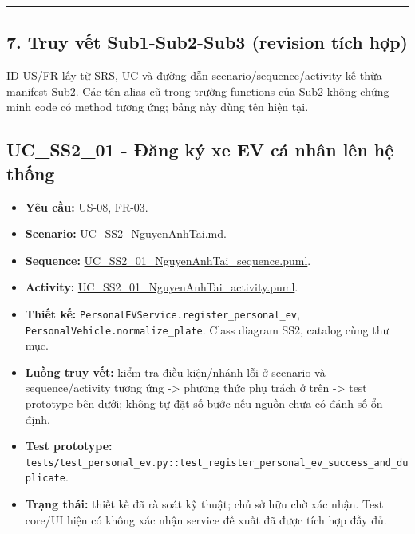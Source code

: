 \documentclass[11pt,a4paper]{article}
\providecommand{\tightlist}{%
  \setlength{\itemsep}{0pt}\setlength{\parskip}{0pt}}
\begin{document}
\begin{center}\rule{0.5\linewidth}{0.5pt}\end{center}

\hypertarget{truy-vux1ebft-sub1-sub2-sub3-revision-tuxedch-hux1ee3p}{%
\subsection{7. Truy vết Sub1-Sub2-Sub3 (revision tích
hợp)}\label{truy-vux1ebft-sub1-sub2-sub3-revision-tuxedch-hux1ee3p}}

ID US/FR lấy từ SRS, UC và đường dẫn scenario/sequence/activity kế thừa
manifest Sub2. Các tên alias cũ trong trường functions của Sub2 không
chứng minh code có method tương ứng; bảng này dùng tên hiện tại.

\hypertarget{uc_ss2_01---ux111ux103ng-kuxfd-xe-ev-cuxe1-nhuxe2n-luxean-hux1ec7-thux1ed1ng}{%
\subsection{UC\_SS2\_01 - Đăng ký xe EV cá nhân lên hệ
thống}\label{uc_ss2_01---ux111ux103ng-kuxfd-xe-ev-cuxe1-nhuxe2n-luxean-hux1ec7-thux1ed1ng}}

\begin{itemize}
\tightlist
\item
  \textbf{Yêu cầu:} US-08, FR-03.
\item
  \textbf{Scenario:}
  \href{../../../../docs/diagrams/Use-case\%20detail-scenario/SS2/Usecase\%20scenario/UC_SS2_NguyenAnhTai.md}{UC\_SS2\_NguyenAnhTai.md}.
\item
  \textbf{Sequence:}
  \href{../../../../docs/diagrams/Use-case\%20detail-scenario/SS2/Sequence\%20diagrams/UC_SS2_01_NguyenAnhTai_sequence.puml}{UC\_SS2\_01\_NguyenAnhTai\_sequence.puml}.
\item
  \textbf{Activity:}
  \href{../../../../docs/diagrams/Use-case\%20detail-scenario/SS2/Activity\%20diagrams/UC_SS2_01_NguyenAnhTai_activity.puml}{UC\_SS2\_01\_NguyenAnhTai\_activity.puml}.
\item
  \textbf{Thiết kế:} \texttt{PersonalEVService.register\_personal\_ev},
  \texttt{PersonalVehicle.normalize\_plate}. Class diagram SS2, catalog
  cùng thư mục.
\item
  \textbf{Luồng truy vết:} kiểm tra điều kiện/nhánh lỗi ở scenario và
  sequence/activity tương ứng -\textgreater{} phương thức phụ trách ở
  trên -\textgreater{} test prototype bên dưới; không tự đặt số bước nếu
  nguồn chưa có đánh số ổn định.
\item
  \textbf{Test prototype:}
  \texttt{tests/test\_personal\_ev.py::test\_register\_personal\_ev\_success\_and\_duplicate}.
\item
  \textbf{Trạng thái:} thiết kế đã rà soát kỹ thuật; chủ sở hữu chờ xác
  nhận. Test core/UI hiện có không xác nhận service đề xuất đã được tích
  hợp đầy đủ.
\end{itemize}
\end{document}
